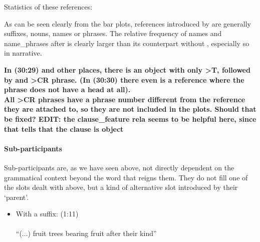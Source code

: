 \documentclass{report}
\newcommand{\cl}[2]{\begingroup\beginL\begingroup\color{#1}\beginR#2\endR\endgroup\endL\endgroup}
\newcommand{\hebr}[1]{\hbox{\cjRL{#1}}}
\begin{document}
Statistics of these references: \\
\noindent
\begin{minipage}{.5\textwidth}

\end{minipage}
\begin{minipage}{.5\textwidth}
\centering

\end{minipage}
As can be seen clearly from the bar plots, references introduced by \hebr{>T} are generally suffixes, nouns, names or phrases. The relative frequency of names and name\_phrases after \hebr{>T} is clearly larger than its counterpart without \hebr{>T}, especially so in narrative.

%
%

\textbf{In (30:29) and other places, there is an object with only >T, followed by and >CR phrase. (In (30:30) there even is a reference where the \hebr{>CR} phrase does not have a head at all).}\\
\textbf{All >CR phrases have a phrase number different from the reference they are attached to, so they are not included in the plots. Should that be fixed? EDIT: the clause\_feature rela seems to be helpful here, since that tells that the clause is object}

\paragraph{Sub-participants}
Sub-participants are, as we have seen above, not directly dependent on the grammatical context beyond the word that reigns them. They do not fill one of the slots dealt with above, but a kind of alternative slot introduced by their `parent'. 


\begin{itemize}
\item With a suffix: (1:11) \\ \hebr{<Y PRJ <FH PRJ L MJN\cl{red}{W}} \\ ``(...) fruit trees bearing fruit after their kind''
\end{itemize}
\end{document}
